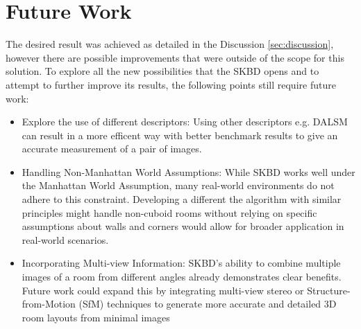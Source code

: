 \section{Future Work}
\label{sec:futurework}
The desired result was achieved as detailed in the Discussion \ref{sec:discussion}, however there are possible improvements that were outside of the scope for this solution.
To explore all the new possibilities that the SKBD opens and to attempt to further improve its results, the following points still require future work:
\begin{itemize}
  \item Explore the use of different descriptors: Using other descriptors e.g. DALSM can result in a more efficent way with better benchmark results to give an accurate measurement of a pair of images.
  \item {Handling Non-Manhattan World Assumptions:} While SKBD works well under the Manhattan World Assumption, many real-world environments do not adhere to this constraint. Developing a different the algorithm with similar principles might handle non-cuboid rooms without relying on specific assumptions about walls and corners would allow for broader application in real-world scenarios.
  \item Incorporating Multi-view Information: SKBD's ability to combine multiple images of a room from different angles already demonstrates clear benefits. Future work could expand this by integrating multi-view stereo or Structure-from-Motion (SfM) techniques to generate more accurate and detailed 3D room layouts from minimal images
\end{itemize}
